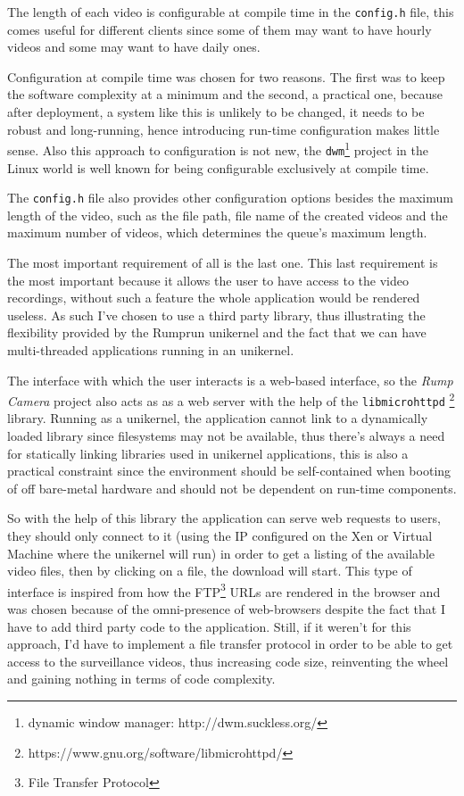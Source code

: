 \documentclass[10pt,a4paper,twoside]{article}
\begin{document}
The length of each video is configurable at compile time in the \texttt{config.h} file, this comes
useful for different clients since some of them may want to have hourly videos and some may want to have daily ones.

Configuration at compile time was chosen for two reasons.
The first was to keep the software complexity at a minimum and the second, a practical one,
because after deployment, a system like this is unlikely to be changed, it needs to be robust and long-running,
hence introducing run-time configuration makes little sense. Also this approach to configuration is not new, the
\texttt{dwm}\footnote{dynamic window manager: http://dwm.suckless.org/} project in the Linux world is well known for
being configurable exclusively at compile time.

The \texttt{config.h} file also provides other configuration options besides the maximum length of the video,
such as the file path, file name of the created videos and the maximum number of videos,
which determines the queue's maximum length.

The most important requirement of all is the last one.
This last requirement is the most important because it allows the user to have access to the video recordings,
without such a feature the whole application would be rendered useless.
As such I've chosen to use a third party library, thus illustrating the flexibility provided by the
Rumprun unikernel and the fact that we can have multi-threaded applications running in an unikernel.

The interface with which the user interacts is a web-based interface, so the \textit{Rump Camera}
project also acts as as a web server with the help of the \texttt{libmicrohttpd}
\footnote{https://www.gnu.org/software/libmicrohttpd/} library. Running as a unikernel, the application
cannot link to a dynamically loaded library since filesystems may not be available, thus there's always a need for statically linking libraries used in unikernel applications, this is also a practical constraint since
the environment should be self-contained when booting of off bare-metal hardware and should not be dependent
on run-time components.

So with the help of this library the application can serve web requests to users,
they should only connect to it (using the IP configured on the Xen or Virtual Machine where the unikernel will run) in order to get a listing of the available video files, then by clicking on a file, the download will start.
This type of interface is inspired from how the FTP\footnote{File Transfer Protocol}
URLs are rendered in the browser and was chosen because of the omni-presence of
web-browsers despite the fact that I have to add third party code to the application.
Still, if it weren't for this approach, I'd
have to implement a file transfer protocol in order to be able to get access to the surveillance videos, thus
increasing code size, reinventing the wheel and gaining nothing in terms of code complexity.
\end{document}
